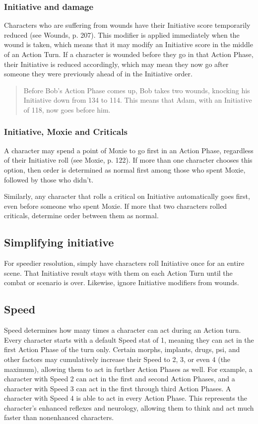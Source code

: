 \subsubsection{Initiative and damage} Characters who are suffering from wounds have their Initiative score temporarily reduced (see Wounds, p. 207). This modifier is applied immediately when the wound is taken, which means that it may modify an Initiative score in the middle of an Action Turn. If a character is wounded before they go in that Action Phase, their Initiative is reduced accordingly, which may mean they now go after someone they were previously ahead of in the Initiative order.

\begin{quotation}
Before Bob’s Action Phase comes up, Bob takes two wounds, knocking his Initiative down from 134 to 114. This means that Adam, with an Initiative of 118, now goes before him.
\end{quotation}

\subsubsection{Initiative, Moxie and Criticals} A character may spend a point of Moxie to go first in an Action Phase, regardless of their Initiative roll (see Moxie, p. 122). If more than one character chooses this option, then order is determined as normal first among those who spent Moxie, followed by those who didn’t.

Similarly, any character that rolls a critical on Initiative automatically goes first, even before someone who spent Moxie. If more that two characters rolled criticals, determine order between them as normal.

\subsection{Simplifying initiative}
\label{sec:simplifying-init}

For speedier resolution, simply have characters roll Initiative once for an entire scene. That Initiative result stays with them on each Action Turn until the combat or scenario is over. Likewise, ignore Initiative modifiers from wounds.

\subsection{Speed}
\label{sec:speed}

Speed determines how many times a character can act during an Action turn. Every character starts with a default Speed stat of 1, meaning they can act in the first Action Phase of the turn only. Certain morphs, implants, drugs, psi, and other factors may cumulatively increase their Speed to 2, 3, or even 4 (the maximum), allowing them to act in further Action Phases as well. For example, a character with Speed 2 can act in the first and second Action Phases, and a character with Speed 3 can act in the first through third Action Phases. A character with Speed 4 is able to act in every Action Phase. This represents the character’s enhanced reflexes and neurology, allowing them to think and act much faster than nonenhanced characters.

